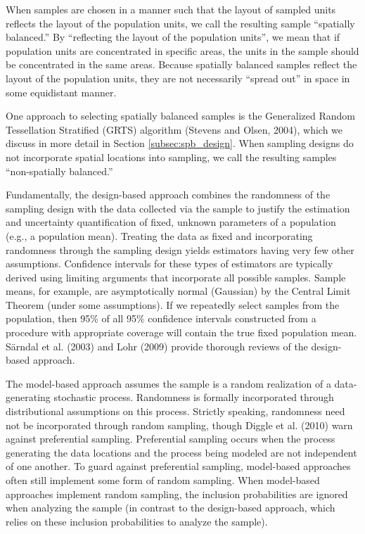 \documentclass[]{elsarticle} %
\begin{document}
When samples are chosen in a manner such that the layout of sampled
units reflects the layout of the population units, we call the resulting
sample ``spatially balanced.'' By ``reflecting the layout of the
population units'', we mean that if population units are concentrated in
specific areas, the units in the sample should be concentrated in the
same areas. Because spatially balanced samples reflect the layout of the
population units, they are not necessarily ``spread out'' in space in
some equidistant manner.

One approach to selecting spatially balanced samples is the Generalized
Random Tessellation Stratified (GRTS) algorithm (Stevens and Olsen,
2004), which we discuss in more detail in Section
\ref{subsec:spb_design}. When sampling designs do not incorporate
spatial locations into sampling, we call the resulting samples
``non-spatially balanced.''

Fundamentally, the design-based approach combines the randomness of the
sampling design with the data collected via the sample to justify the
estimation and uncertainty quantification of fixed, unknown parameters
of a population (e.g., a population mean). Treating the data as fixed
and incorporating randomness through the sampling design yields
estimators having very few other assumptions. Confidence intervals for
these types of estimators are typically derived using limiting arguments
that incorporate all possible samples. Sample means, for example, are
asymptotically normal (Gaussian) by the Central Limit Theorem (under
some assumptions). If we repeatedly select samples from the population,
then 95\% of all 95\% confidence intervals constructed from a procedure
with appropriate coverage will contain the true fixed population mean.
Särndal et al. (2003) and Lohr (2009) provide thorough reviews of the
design-based approach.

The model-based approach assumes the sample is a random realization of a
data-generating stochastic process. Randomness is formally incorporated
through distributional assumptions on this process. Strictly speaking,
randomness need not be incorporated through random sampling, though
Diggle et al. (2010) warn against preferential sampling. Preferential
sampling occurs when the process generating the data locations and the
process being modeled are not independent of one another. To guard
against preferential sampling, model-based approaches often still
implement some form of random sampling. When model-based approaches
implement random sampling, the inclusion probabilities are ignored when
analyzing the sample (in contrast to the design-based approach, which
relies on these inclusion probabilities to analyze the sample).
\end{document}

